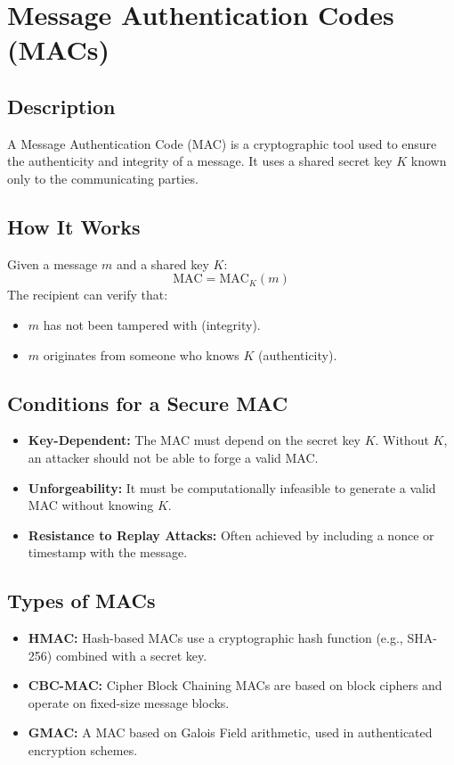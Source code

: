 \documentclass[12pt]{article}
\begin{document}
\section*{Message Authentication Codes (MACs)}
\subsection*{Description}
A Message Authentication Code (MAC) is a cryptographic tool used to ensure the authenticity and integrity of a message. It uses a shared secret key \( K \) known only to the communicating parties.

\subsection*{How It Works}
Given a message \( m \) and a shared key \( K \):
\[
\text{MAC} = \text{MAC}_K(m)
\]
The recipient can verify that:
\begin{itemize}
    \item \( m \) has not been tampered with (integrity).
    \item \( m \) originates from someone who knows \( K \) (authenticity).
\end{itemize}

\subsection*{Conditions for a Secure MAC}
\begin{itemize}
    \item \textbf{Key-Dependent:} The MAC must depend on the secret key \( K \). Without \( K \), an attacker should not be able to forge a valid MAC.
    \item \textbf{Unforgeability:} It must be computationally infeasible to generate a valid MAC without knowing \( K \).
    \item \textbf{Resistance to Replay Attacks:} Often achieved by including a nonce or timestamp with the message.
\end{itemize}

\subsection*{Types of MACs}
\begin{itemize}
    \item \textbf{HMAC:} Hash-based MACs use a cryptographic hash function (e.g., SHA-256) combined with a secret key.
    \item \textbf{CBC-MAC:} Cipher Block Chaining MACs are based on block ciphers and operate on fixed-size message blocks.
    \item \textbf{GMAC:} A MAC based on Galois Field arithmetic, used in authenticated encryption schemes.
\end{itemize}
\end{document}
